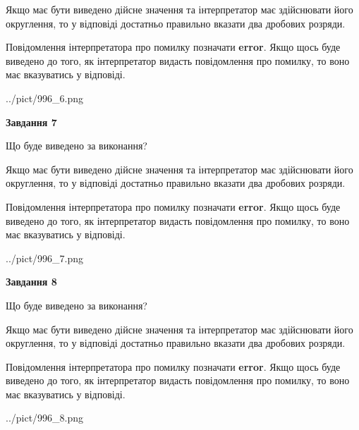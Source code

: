 \documentclass[12pt, ukrainian]{article}
\begin{document}
{\begin {Large}
Якщо має бути виведено дійсне значення та інтерпретатор має здійснювати його округлення, 
то у відповіді достатньо правильно вказати два дробових розряди.

Повідомлення інтерпретатора про помилку позначати \textbf{error}.
Якщо щось буде виведено до того, як інтерпретатор видасть повідомлення про помилку, 
то воно має вказуватись у відповіді. \par

\begin{center}
	{../pict/996_6.png}
\end{center}
\newpage

{\begin {center}\textbf{Завдання 7}\end {center}}\par
Що буде виведено за виконання? \par

Якщо має бути виведено дійсне значення та інтерпретатор має здійснювати його округлення, 
то у відповіді достатньо правильно вказати два дробових розряди.

Повідомлення інтерпретатора про помилку позначати \textbf{error}.
Якщо щось буде виведено до того, як інтерпретатор видасть повідомлення про помилку, 
то воно має вказуватись у відповіді. \par

\begin{center}
	{../pict/996_7.png}
\end{center}
\newpage

{\begin {center}\textbf{Завдання 8}\end {center}}\par
Що буде виведено за виконання? \par

Якщо має бути виведено дійсне значення та інтерпретатор має здійснювати його округлення, 
то у відповіді достатньо правильно вказати два дробових розряди.

Повідомлення інтерпретатора про помилку позначати \textbf{error}.
Якщо щось буде виведено до того, як інтерпретатор видасть повідомлення про помилку, 
то воно має вказуватись у відповіді. \par

\begin{center}
	{../pict/996_8.png}
\end{center}
\newpage


\end{Large}}
\end{document}
